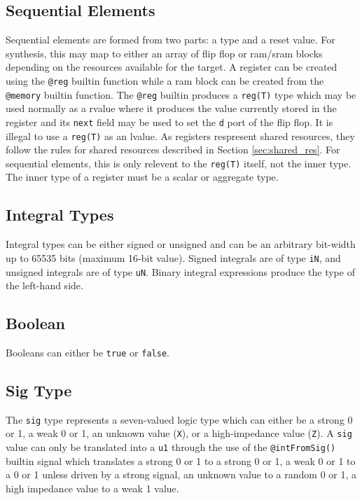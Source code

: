 \documentclass[10pt]{article}
\begin{document}
\subsection{Sequential Elements}
Sequential elements are formed from two parts: a type and a reset value. For synthesis, this may
map to either an array of flip flop or ram/sram blocks depending on the resources available for the
target. A register can be created using the \verb|@reg| builtin function while a ram block can be
created from the \verb|@memory| builtin function. The \verb|@reg| builtin produces a \verb|reg(T)|
type which may be used normally as a rvalue where it produces the value currently stored in the
register and its \verb|next| field may be used to set the \verb|d| port of the flip flop. It is
illegal to use a \verb|reg(T)| as an lvalue. As registers respresent shared resources, they follow
the rules for shared resources described in Section \ref{sec:shared_res}. For sequential elements,
this is only relevent to the \verb|reg(T)| itself, not the inner type. The inner type of a register
must be a scalar or aggregate type.

\subsection{Integral Types}
Integral types can be either signed or unsigned and can be an arbitrary bit-width up to 65535 bits
(maximum 16-bit value). Signed integrals are of type \verb|iN|, and unsigned integrals are of type
\verb|uN|. Binary integral expressions produce the type of the left-hand side.

\subsection{Boolean}
Booleans can either be \verb|true| or \verb|false|.

\subsection{Sig Type}
The \verb|sig| type represents a seven-valued logic type which can either be a strong 0 or 1, a weak
0 or 1, an unknown value (\verb|X|), or a high-impedance value (\verb|Z|). A \verb|sig| value can
only be translated into a \verb|u1| through the use of the \verb|@intFromSig()| builtin signal
which translates a strong 0 or 1 to a strong 0 or 1, a weak 0 or 1 to a 0 or 1 unless driven by
a strong signal, an unknown value to a random 0 or 1, a high impedance value to a weak 1 value.
\end{document}
